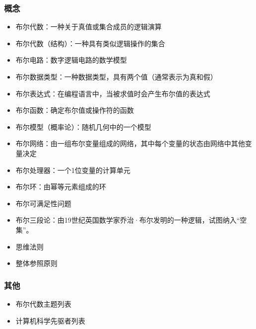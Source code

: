 \subsubsection{概念}  
\begin{itemize}
\item 布尔代数：一种关于真值或集合成员的逻辑演算  
\item 布尔代数（结构）：一种具有类似逻辑操作的集合  
\item 布尔电路：数字逻辑电路的数学模型  
\item 布尔数据类型：一种数据类型，具有两个值（通常表示为真和假）  
\item 布尔表达式：在编程语言中，当被求值时会产生布尔值的表达式  
\item 布尔函数：确定布尔值或操作符的函数  
\item 布尔模型（概率论）：随机几何中的一个模型  
\item 布尔网络：由一组布尔变量组成的网络，其中每个变量的状态由网络中其他变量决定  
\item 布尔处理器：一个1位变量的计算单元  
\item 布尔环：由幂等元素组成的环  
\item 布尔可满足性问题  
\item 布尔三段论：由19世纪英国数学家乔治·布尔发明的一种逻辑，试图纳入“空集”。  
\item 思维法则  
\item 整体参照原则 
\end{itemize} 
\subsubsection{其他}  
\begin{itemize}
\item 布尔代数主题列表  
\item 计算机科学先驱者列表
\end{itemize}
